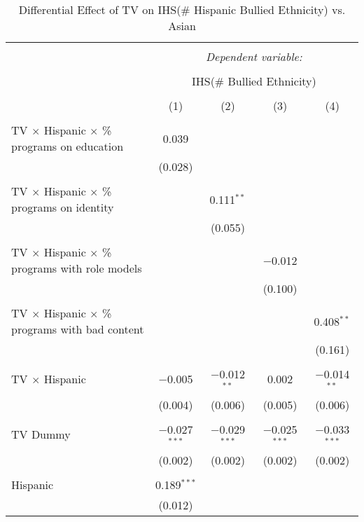 
\begin{table}[!htbp] \centering 
  \caption{Differential Effect of TV on IHS(\# Hispanic Bullied Ethnicity) vs. Asian} 
  \label{} 
\begin{tabular}{@{\extracolsep{-2pt}}lcccc} 
\\[-1.8ex]\hline 
\hline \\[-1.8ex] 
 & \multicolumn{4}{c}{\textit{Dependent variable:}} \\ 
\cline{2-5} 
\\[-1.8ex] & \multicolumn{4}{c}{IHS(\# Bullied Ethnicity)} \\ 
\\[-1.8ex] & (1) & (2) & (3) & (4)\\ 
\hline \\[-1.8ex] 
 TV $\times$ Hispanic $\times$ \% programs on education & 0.039 &  &  &  \\ 
  & (0.028) &  &  &  \\ 
  & & & & \\ 
 TV $\times$ Hispanic $\times$ \% programs on identity &  & 0.111$^{**}$ &  &  \\ 
  &  & (0.055) &  &  \\ 
  & & & & \\ 
 TV $\times$ Hispanic $\times$ \% programs with role models &  &  & $-$0.012 &  \\ 
  &  &  & (0.100) &  \\ 
  & & & & \\ 
 TV $\times$ Hispanic $\times$ \% programs with bad content &  &  &  & 0.408$^{**}$ \\ 
  &  &  &  & (0.161) \\ 
  & & & & \\ 
 TV $\times$ Hispanic & $-$0.005 & $-$0.012$^{**}$ & 0.002 & $-$0.014$^{**}$ \\ 
  & (0.004) & (0.006) & (0.005) & (0.006) \\ 
  & & & & \\ 
 TV Dummy & $-$0.027$^{***}$ & $-$0.029$^{***}$ & $-$0.025$^{***}$ & $-$0.033$^{***}$ \\ 
  & (0.002) & (0.002) & (0.002) & (0.002) \\ 
  & & & & \\ 
 Hispanic & 0.189$^{***}$ &  &  &  \\ 
  & (0.012) &  &  &  \\ 

\end{tabular}
\end{table}
